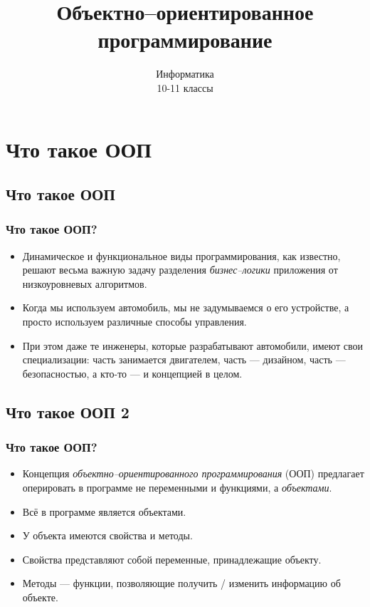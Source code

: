 \documentclass[compress,red]{beamer}
\title{Объектно--ориентированное программирование}
\author{Информатика \\ 10-11 классы}
\begin{document}
\maketitle

\section{Что такое ООП}

\subsection{Что такое ООП}
\begin{frame}
  \frametitle{Что такое ООП?}
  \begin{itemize}
    \item Динамическое и функциональное виды программирования, как известно, решают весьма важную задачу разделения \emph{бизнес--логики} приложения от низкоуровневых алгоритмов.
    \item Когда мы используем автомобиль, мы не задумываемся о его устройстве, а просто используем различные способы управления.
    \item При этом даже те инженеры, которые разрабатывают автомобили, имеют свои специализации: часть занимается двигателем, часть --- дизайном, часть --- безопасностью, а кто-то --- и концепцией в целом.
  \end{itemize}
\end{frame}

\subsection{Что такое ООП 2}
\begin{frame}
  \frametitle{Что такое ООП?}
  \begin{itemize}
    \item Концепция \emph{объектно--ориентированного программирования} (ООП) предлагает оперировать в программе не переменными и функциями, а \emph{объектами}.
    \item Всё в программе является объектами.
    \item У объекта имеются свойства и методы. 
    \item Свойства представляют собой переменные, принадлежащие объекту.
    \item Методы --- функции, позволяющие получить / изменить информацию об объекте.
  \end{itemize}
\end{frame}
\end{document}
